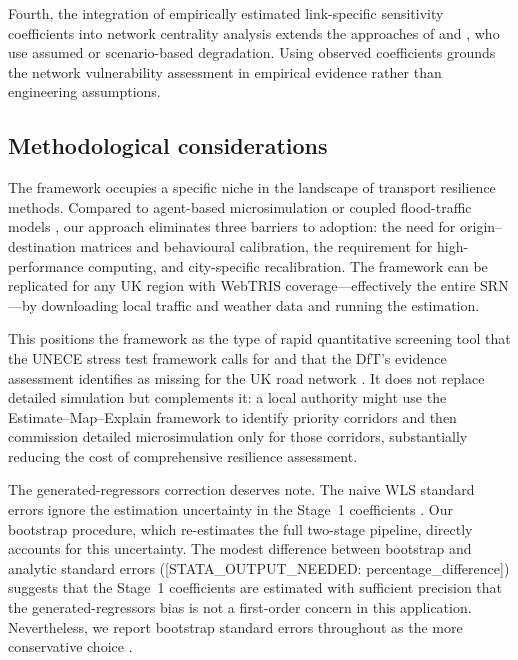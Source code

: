 \documentclass[review]{elsarticle}
\begin{document}
Fourth, the integration of empirically estimated link-specific sensitivity coefficients into network centrality analysis extends the approaches of \citet{wassmer2024resilience} and \citet{stamos2023centrality}, who use assumed or scenario-based degradation. Using observed coefficients grounds the network vulnerability assessment in empirical evidence rather than engineering assumptions.

\subsection{Methodological considerations}
\label{sec:disc:method}

The framework occupies a specific niche in the landscape of transport resilience methods. Compared to agent-based microsimulation \citep{huang2022overview,he2026flood} or coupled flood-traffic models \citep{pregnolato2017depth,pregnolato2016impact,farahmand2024integrating}, our approach eliminates three barriers to adoption: the need for origin--destination matrices and behavioural calibration, the requirement for high-performance computing, and city-specific recalibration. The framework can be replicated for any UK region with WebTRIS coverage---effectively the entire SRN---by downloading local traffic and weather data and running the estimation.

This positions the framework as the type of rapid quantitative screening tool that the UNECE stress test framework calls for \citep{unece2024stress} and that the DfT's evidence assessment identifies as missing for the UK road network \citep{dft2024rea}. It does not replace detailed simulation but complements it: a local authority might use the Estimate--Map--Explain framework to identify priority corridors and then commission detailed microsimulation only for those corridors, substantially reducing the cost of comprehensive resilience assessment.

The generated-regressors correction deserves note. The naive WLS standard errors ignore the estimation uncertainty in the Stage~1 coefficients \citep{pagan1984econometric}. Our bootstrap procedure, which re-estimates the full two-stage pipeline, directly accounts for this uncertainty. The modest difference between bootstrap and analytic standard errors ([STATA\_OUTPUT\_NEEDED: percentage\_difference]) suggests that the Stage~1 coefficients are estimated with sufficient precision that the generated-regressors bias is not a first-order concern in this application. Nevertheless, we report bootstrap standard errors throughout as the more conservative choice \citep{murphy1985estimation}.
\end{document}
